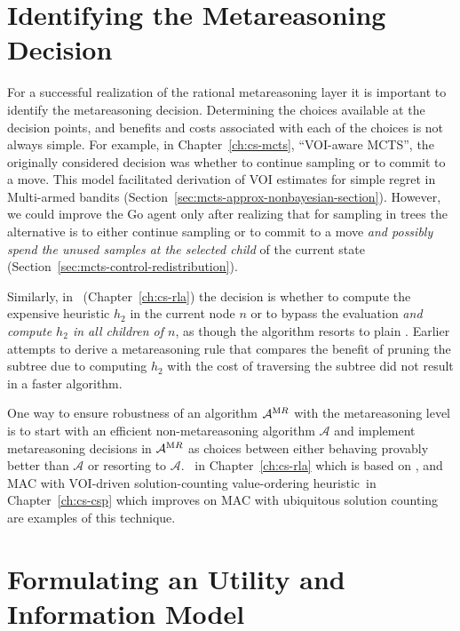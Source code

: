 \section{Identifying the Metareasoning Decision}

For a successful realization of the rational metareasoning layer it is
important to identify the metareasoning decision. Determining the
choices available at the decision points, and benefits and costs
associated with each of the choices is not always simple. For example,
in Chapter~\ref{ch:cs-mcts}, ``VOI-aware MCTS'', the originally
considered decision was whether to continue sampling or to commit to a
move. This model facilitated derivation of VOI estimates for simple
regret in Multi-armed bandits
(Section~\ref{sec:mcts-approx-nonbayesian-section}). However, we could
improve the Go agent only after realizing that for sampling in trees
the alternative is to either continue sampling or to commit to a move
\emph{and possibly spend the unused samples at the selected child} of
the current state (Section~\ref{sec:mcts-control-redistribution}).

Similarly, in \rationallazyastar~(Chapter~\ref{ch:cs-rla}) the
decision is whether to compute the expensive heuristic $h_2$ in the current
node $n$ or to bypass the evaluation \emph{and compute $h_2$ in all
  children of $n$}, as though the algorithm resorts to plain \lazyastar.
Earlier attempts to derive a metareasoning rule that compares the
benefit of pruning the subtree due to computing $h_2$ 
with the cost of traversing the subtree did not result in a faster
algorithm. 

One way to ensure robustness of an algorithm ${\mathcal A}^{\textrm MR}$ with the
metareasoning level is to start with an efficient non-metareasoning
algorithm ${\mathcal A}$ and implement metareasoning decisions in ${\mathcal
A}^{\textrm MR}$ as choices
between either behaving provably better than ${\mathcal A}$ or
resorting to ${\mathcal A}$.
\rationallazyastar~in Chapter~\ref{ch:cs-rla} which is based on
\lazyastar, and MAC with VOI-driven solution-counting value-ordering
heuristic~in Chapter~\ref{ch:cs-csp} which improves on MAC with
ubiquitous solution counting are examples of this technique.

\section{Formulating an Utility and Information Model}

